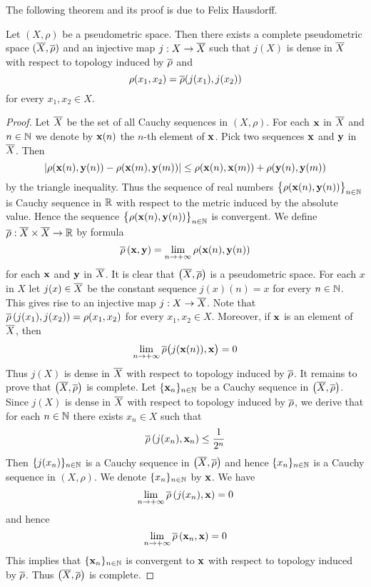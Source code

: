 \noindent
The following theorem and its proof is due to Felix Hausdorff.

\begin{theorem}\label{theorem:completion_of_a_pseudometric_space}
Let $(X,\rho)$ be a pseudometric space. Then there exists a complete pseudometric space $(\overline{X},\overline{\rho})$ and an injective map $j:X\rightarrow \overline{X}$ such that $j(X)$ is dense in $\overline{X}$ with respect to topology induced by $\overline{\rho}$ and
$$\rho(x_1,x_2) = \overline{\rho}(j(x_1),j(x_2))$$
for every $x_1,x_2\in X$.
\end{theorem}
\begin{proof}
Let $\overline{X}$ be the set of all Cauchy sequences in $(X,\rho)$. For each $\mathbf{x}$ in $\overline{X}$ and $n\in {\mathbb N}$ we denote by $\mathbf{x}(n)$ the $n$-th element of $\mathbf{x}$. Pick two sequences $\mathbf{x}$ and $\mathbf{y}$ in $\overline{X}$. Then
$$|\rho(\mathbf{x}(n),\mathbf{y}(n)) - \rho(\mathbf{x}(m),\mathbf{y}(m))|\leq \rho(\mathbf{x}(n),\mathbf{x}(m)) + \rho(\mathbf{y}(n),\mathbf{y}(m))$$
by the triangle inequality. Thus the sequence of real numbers $\big\{\rho(\mathbf{x}(n),\mathbf{y}(n))\big\}_{n\in {\mathbb N}}$ is Cauchy sequence in ${\mathbb R}$ with respect to the metric induced by the absolute value. Hence the sequence $\big\{\rho(\mathbf{x}(n),\mathbf{y}(n))\big\}_{n\in {\mathbb N}}$ is convergent. We define $\overline{\rho}:\overline{X}\times \overline{X}\rightarrow {\mathbb R}$ by formula 
$$\overline{\rho}\left(\mathbf{x}, \mathbf{y}\right) = \lim_{n\rightarrow +\infty}\rho(\mathbf{x}(n),\mathbf{y}(n))$$
for each $\mathbf{x}$ and $\mathbf{y}$ in $\overline{X}$. It is clear that $\left(\overline{X},\overline{\rho}\right)$ is a pseudometric space. For each $x$ in $X$ let $j(x) \in \overline{X}$ be the constant sequence $j(x)(n) = x$ for every $n\in {\mathbb N}$. This gives rise to an injective map $j:X\rightarrow \overline{X}$. Note that $\overline{\rho}\left(j(x_1),j(x_2)\right) = \rho(x_1, x_2)$ for every $x_1,x_2\in X$. Moreover, if $\mathbf{x}$ is an element of $\overline{X}$, then 
$$\lim_{n\rightarrow +\infty}\overline{\rho}\big(j(\mathbf{x}(n)),\mathbf{x}\big) = 0$$
Thus $j(X)$ is dense in $\overline{X}$ with respect to topology induced by $\overline{\rho}$. It remains to prove that $\left(\overline{X},\overline{\rho}\right)$ is complete. Let $\{\mathbf{x}_n\}_{n\in {\mathbb N}}$ be a Cauchy sequence in $\left(\overline{X},\overline{\rho}\right)$. Since $j(X)$ is dense in $\overline{X}$ with respect to topology induced by $\overline{\rho}$, we derive that for each $n\in {\mathbb N}$ there exists $x_n \in X$ such that 
$$\overline{\rho}\left(j(x_n), \mathbf{x}_n\right) \leq \frac{1}{2^n}$$
Then $\{j(x_n)\}_{n\in {\mathbb N}}$ is a Cauchy sequence in $\left(\overline{X},\overline{\rho}\right)$ and hence $\{x_n\}_{n\in {\mathbb N}}$ is a Cauchy sequence in $\left(X,\rho\right)$. We denote $\{x_n\}_{n\in {\mathbb N}}$ by $\mathbf{x}$. We have
$$\lim_{n\rightarrow +\infty}\overline{\rho}\left(j(x_n),\mathbf{x}\right) = 0$$
and hence
$$\lim_{n\rightarrow +\infty}\overline{\rho}\left(\mathbf{x}_n,\mathbf{x}\right) = 0$$
This implies that $\{\mathbf{x}_n\}_{n\in {\mathbb N}}$ is convergent to $\mathbf{x}$ with respect to topology induced by $\overline{\rho}$. Thus $\left(\overline{X},\overline{\rho}\right)$ is complete.   
\end{proof}

